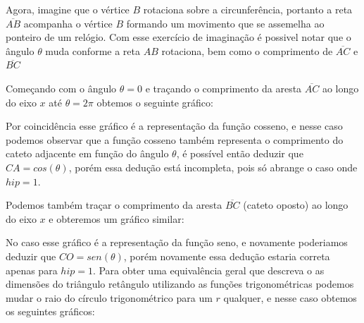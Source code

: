 \begin{multicols*}{2}
    Agora, imagine que o vértice $B$ rotaciona sobre a circunferência, portanto
    a reta $\overline{AB}$ acompanha o vértice $B$ formando um movimento que se assemelha
    ao ponteiro de um relógio. Com esse exercício de imaginação é possivel notar
    que o ângulo $\theta$ muda conforme a reta $AB$ rotaciona, bem como o
    comprimento de $\overline{AC}$ e $\overline{BC}$

    Começando com o ângulo $\theta=0$ e traçando o comprimento da aresta $\overline{AC}$
    ao longo do eixo $x$ até $\theta=2\pi$ obtemos o seguinte gráfico:

    \begin{figure}[H]
        \centering
    \end{figure}


    Por coincidência esse gráfico é a representação da função cosseno,
    e nesse caso podemos observar que a função cosseno também representa o
    comprimento do cateto adjacente em função do ângulo $\theta$, é possível
    então deduzir que $CA = cos(\theta)$, porém essa dedução está incompleta,
    pois só abrange o caso onde $hip = 1$.

    Podemos também traçar o comprimento da aresta $\overline{BC}$ (cateto oposto)
    ao longo do eixo $x$ e obteremos um gráfico similar:
    \begin{figure}[H]
        \centering
    \end{figure}

    No caso esse gráfico é a representação da função seno, e novamente poderiamos
    deduzir que $CO = sen(\theta)$, porém novamente essa dedução estaria correta
    apenas para $hip = 1$. Para obter uma equivalência geral que descreva o
    as dimensões do triângulo retângulo utilizando as funções trigonométricas
    podemos mudar o raio do círculo trigonométrico para um $r$ qualquer,
    e nesse caso obtemos os seguintes gráficos:


\end{multicols*}
